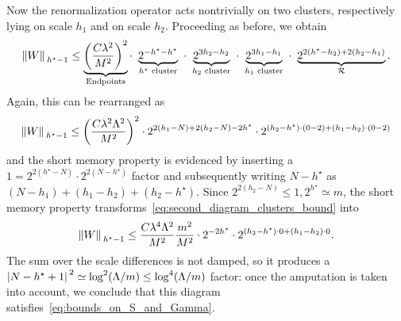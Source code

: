 \documentclass[a4paper, 11pt]{article}
\newcommand{\cutoff}{\Lambda}								%
\newcommand{\ren}{\mathcal{R}}								%
\theoremstyle{thm}
\begin{document}
Now the renormalization operator acts nontrivially on two clusters, respectively lying on scale $h_1$ and on scale $h_2$. Proceeding as before, we obtain
\begin{equation}
\norm*{W}_{h^\star-1} \le \underbrace{\left(\frac{C \lambda^2}{M^2}\right)^2}_{\text{Endpoints}} \cdot \,\, \underbrace{2^{-h^\star - h^\star}}_{h^\star \text{ cluster}} \,\, \cdot \,\, \underbrace{2^{3h_2 - h_2}}_{h_2 \text{ cluster}} \,\, \cdot \,\, \underbrace{2^{3h_1 - h_1}}_{h_1 \text{ cluster}} \,\, \cdot \,\, \underbrace{2^{2(h^\star - h_2) + 2(h_2 - h_1)}}_{\ren}.
\end{equation}
Again, this can be rearranged as
\begin{equation}
\label{eq:second_diagram_clusters_bound}
\norm*{W}_{h^\star-1} \le \left(\frac{C \lambda^2 \cutoff^2}{M^2}\right)^2 \cdot 2^{2(h_1 - N) + 2(h_2 - N) -2h^\star} \cdot 2^{(h_2 - h^\star) \cdot (0 - 2) + (h_1 - h_2) \cdot (0 - 2)}
\end{equation}
and the short memory property is evidenced by inserting a $1 = 2^{2(h^\star - N)} \cdot 2^{2(N - h^\star)}$ factor and subsequently writing $N - h^\star$ as $(N - h_1) + (h_1 - h_2) + (h_2 - h^\star)$. Since $2^{2(h_2 - N)} \le 1, 2^{h^\star} \simeq m$, the short memory property transforms~\eqref{eq:second_diagram_clusters_bound} into
\begin{equation}
\norm*{W}_{h^\star-1} \le \frac{C \lambda^4 \cutoff^2}{M^2} \frac{m^2}{M^2} \cdot 2^{-2h^\star} \cdot 2^{(h_2 - h^\star) \cdot 0 + (h_1 - h_2) \cdot 0}.
\end{equation}
The sum over the scale differences is not damped, so it produces a $\abs*{N - h^\star + 1}^2 \simeq \log^2(\cutoff/m) \le \log^4(\cutoff/m)$ factor: once the amputation is taken into account, we conclude that this diagram satisfies~\eqref{eq:bounds_on_S_and_Gamma}.
\end{document}
